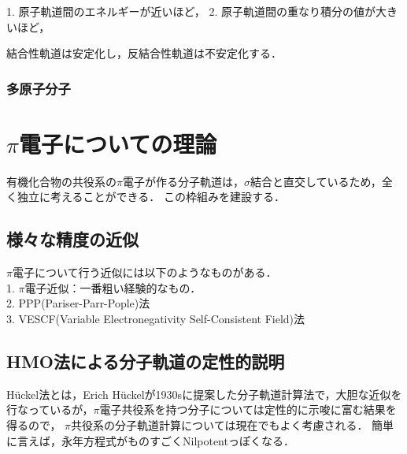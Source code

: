 \documentclass[uplatex, dvipdfmx]{jsreport}
\begin{document}
\begin{screen}
    1. 原子軌道間のエネルギーが近いほど，
    2. 原子軌道間の重なり積分の値が大きいほど，

    結合性軌道は安定化し，反結合性軌道は不安定化する．
\end{screen}

\subsubsection{多原子分子}

\section{$\pi$電子についての理論}\label{section-frontier}
有機化合物の共役系の$\pi$電子が作る分子軌道は，$\sigma$結合と直交しているため，全く独立に考えることができる．
この枠組みを建設する．

\subsection{様々な精度の近似}

$\pi$電子について行う近似には以下のようなものがある．\\
1. $\pi$電子近似：一番粗い経験的なもの．\\
2. PPP(Pariser-Parr-Pople)法 \\
3. VESCF(Variable Electronegativity Self-Consistent Field)法

\subsection{HMO法による分子軌道の定性的説明}
Hückel法とは，Erich Hückelが1930sに提案した分子軌道計算法で，大胆な近似を行なっているが，$\pi$電子共役系を持つ分子については定性的に示唆に富む結果を得るので，
$\pi$共役系の分子軌道計算については現在でもよく考慮される．
簡単に言えば，永年方程式がものすごくNilpotentっぽくなる．
\end{document}
